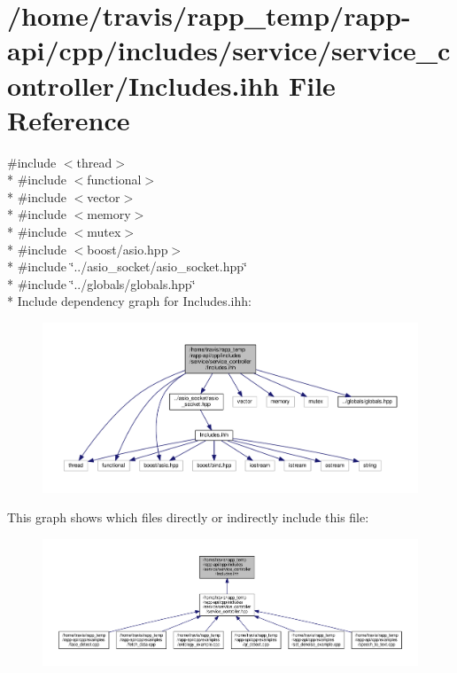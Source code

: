 \hypertarget{service_2service__controller_2Includes_8ihh}{\section{/home/travis/rapp\-\_\-temp/rapp-\/api/cpp/includes/service/service\-\_\-controller/\-Includes.ihh File Reference}
\label{service_2service__controller_2Includes_8ihh}
}
{\ttfamily \#include $<$thread$>$}\\*
{\ttfamily \#include $<$functional$>$}\\*
{\ttfamily \#include $<$vector$>$}\\*
{\ttfamily \#include $<$memory$>$}\\*
{\ttfamily \#include $<$mutex$>$}\\*
{\ttfamily \#include $<$boost/asio.\-hpp$>$}\\*
{\ttfamily \#include \char`\"{}../asio\-\_\-socket/asio\-\_\-socket.\-hpp\char`\"{}}\\*
{\ttfamily \#include \char`\"{}../globals/globals.\-hpp\char`\"{}}\\*
Include dependency graph for Includes.\-ihh\-:
\nopagebreak
\begin{figure}[H]
\begin{center}
\leavevmode
\includegraphics[width=350pt]{service_2service__controller_2Includes_8ihh__incl}
\end{center}
\end{figure}
This graph shows which files directly or indirectly include this file\-:
\nopagebreak
\begin{figure}[H]
\begin{center}
\leavevmode
\includegraphics[width=350pt]{service_2service__controller_2Includes_8ihh__dep__incl}
\end{center}
\end{figure}
